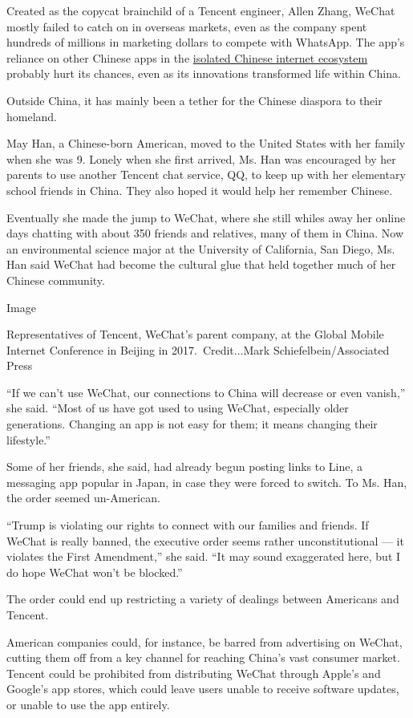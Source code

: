 Created as the copycat brainchild of a Tencent engineer, Allen Zhang,
WeChat mostly failed to catch on in overseas markets, even as the
company spent hundreds of millions in marketing dollars to compete with
WhatsApp. The app's reliance on other Chinese apps in the
\href{https://www.nytimes.com/2016/08/10/technology/china-homegrown-internet-companies-rest-of-the-world.html}{isolated
Chinese internet ecosystem} probably hurt its chances, even as its
innovations transformed life within China.

Outside China, it has mainly been a tether for the Chinese diaspora to
their homeland.

May Han, a Chinese-born American, moved to the United States with her
family when she was 9. Lonely when she first arrived, Ms. Han was
encouraged by her parents to use another Tencent chat service, QQ, to
keep up with her elementary school friends in China. They also hoped it
would help her remember Chinese.

Eventually she made the jump to WeChat, where she still whiles away her
online days chatting with about 350 friends and relatives, many of them
in China. Now an environmental science major at the University of
California, San Diego, Ms. Han said WeChat had become the cultural glue
that held together much of her Chinese community.

Image

Representatives of Tencent, WeChat's parent company, at the Global
Mobile Internet Conference in Beijing in 2017.~Credit...Mark
Schiefelbein/Associated Press

``If we can't use WeChat, our connections to China will decrease or even
vanish,'' she said. ``Most of us have got used to using WeChat,
especially older generations. Changing an app is not easy for them; it
means changing their lifestyle.''

Some of her friends, she said, had already begun posting links to Line,
a messaging app popular in Japan, in case they were forced to switch. To
Ms. Han, the order seemed un-American.

``Trump is violating our rights to connect with our families and
friends. If WeChat is really banned, the executive order seems rather
unconstitutional --- it violates the First Amendment,'' she said. ``It
may sound exaggerated here, but I do hope WeChat won't be blocked.''

The order could end up restricting a variety of dealings between
Americans and Tencent.

American companies could, for instance, be barred from advertising on
WeChat, cutting them off from a key channel for reaching China's vast
consumer market. Tencent could be prohibited from distributing WeChat
through Apple's and Google's app stores, which could leave users unable
to receive software updates, or unable to use the app entirely.

